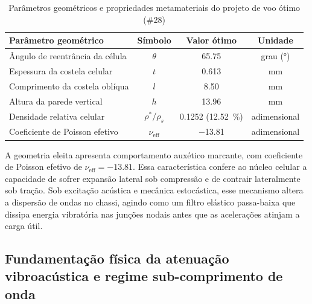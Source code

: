 \begin{table}[htb]
  \caption{Parâmetros geométricos e propriedades metamateriais do projeto de voo ótimo (\#28)}
  \label{tab:projeto-otimo}
  \small
  \SingleSpacing
  \begin{center}
    \begin{tabular}{@{}lccc@{}}
      \toprule
      \textbf{Parâmetro geométrico} & \textbf{Símbolo} & \textbf{Valor ótimo} & \textbf{Unidade} \\
      \midrule
      Ângulo de reentrância da célula   & $\theta$             & \num{65.75}                          & grau (\si{\degree}) \\
      Espessura da costela celular      & $t$                  & \num{0.613}                          & \si{\milli\metre} \\
      Comprimento da costela oblíqua    & $l$                  & \num{8.50}                           & \si{\milli\metre} \\
      Altura da parede vertical         & $h$                  & \num{13.96}                          & \si{\milli\metre} \\
      Densidade relativa celular        & $\rho^{*} / \rho_s$  & \num{0.1252} (\SI{12.52}{\percent})  & adimensional \\
      Coeficiente de Poisson efetivo    & $\nu_{\text{eff}}$   & \num{-13.81}                         & adimensional \\
      \bottomrule
    \end{tabular}
  \end{center}
\end{table}

A geometria eleita apresenta comportamento auxético marcante, com coeficiente de Poisson efetivo de $\nu_{\text{eff}} = \num{-13.81}$. Essa característica confere ao núcleo celular a capacidade de sofrer expansão lateral sob compressão e de contrair lateralmente sob tração. Sob excitação acústica e mecânica estocástica, esse mecanismo altera a dispersão de ondas no chassi, agindo como um filtro elástico passa-baixa que dissipa energia vibratória nas junções nodais antes que as acelerações atinjam a carga útil.

\subsection{Fundamentação física da atenuação vibroacústica e regime sub-comprimento de onda}
\label{subsec:bloch-resultados}

